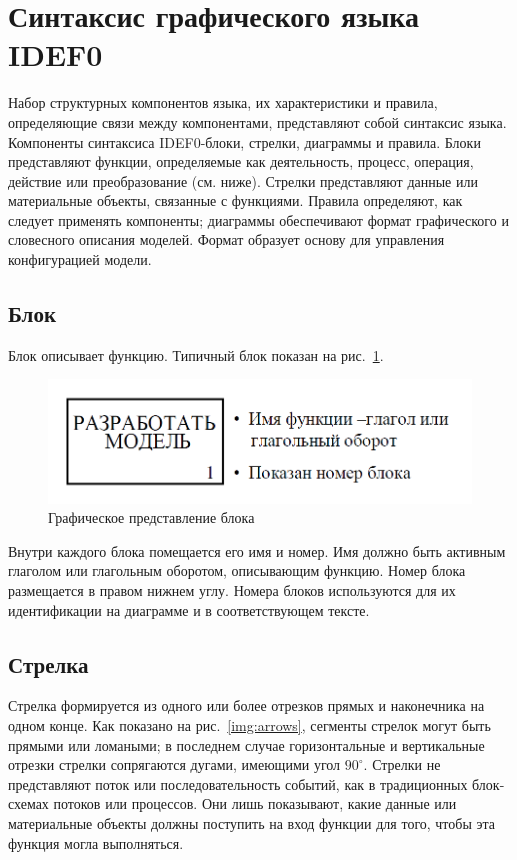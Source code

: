 \documentclass[a4paper, final]{article}
\begin{document}
\newpage
\section{Синтаксис графического языка IDEF0}
Набор структурных компонентов языка, их характеристики и правила, определяющие связи между компонентами, представляют собой синтаксис языка.
Компоненты синтаксиса IDEF0-блоки, стрелки, диаграммы и правила. Блоки представляют функции, определяемые как деятельность, процесс, операция, действие или преобразование (см. ниже). Стрелки представляют данные или материальные объекты, связанные с функциями. Правила определяют, как следует применять компоненты; диаграммы обеспечивают формат графического и словесного описания моделей. Формат образует основу для управления конфигурацией модели.

\subsection{Блок}
Блок описывает функцию. Типичный блок показан на рис.~\ref{img:block}. 

\begin{figure}[H]
  \centering
  \includegraphics[width=0.7\linewidth]{block.png}
  \caption{Графическое представление блока}
  \label{img:block}
\end{figure}

Внутри каждого блока помещается его имя и номер. Имя должно быть активным
глаголом или глагольным оборотом, описывающим функцию. Номер блока размещается в правом нижнем углу. Номера блоков используются для их идентификации на диаграмме и в соответствующем тексте.


\subsection{Стрелка}
Стрелка формируется из одного или более отрезков прямых и наконечника на одном конце. Как показано на рис.~\ref{img:arrows}, сегменты стрелок могут быть прямыми или ломаными; в последнем случае горизонтальные и вертикальные отрезки стрелки сопрягаются дугами, имеющими угол $90^\circ$. Стрелки не представляют поток или последовательность событий, как в традиционных блок-схемах потоков или процессов. Они лишь показывают, какие данные или материальные объекты должны поступить на вход функции для того, чтобы эта функция могла выполняться.
\end{document}
